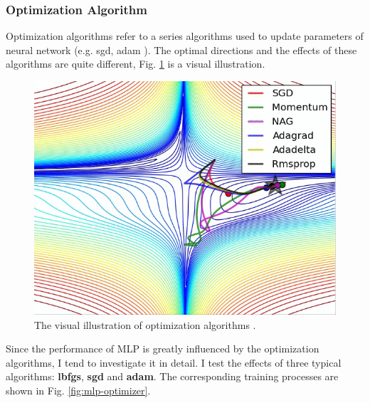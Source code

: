 \documentclass[12pt,a4paper]{article}
\theoremstyle{definition}
\begin{document}
\subsubsection{Optimization Algorithm}
\label{sec:optim}

Optimization algorithms refer to a series algorithms used to update parameters of neural network (e.g. sgd, adam \cite{adam}). The optimal directions and the effects of these algorithms are quite different, Fig. \ref{fig:example} is a visual illustration.

\begin{figure}[H]
	\centering
	\includegraphics[width=0.45\linewidth]{img/optim_example.png}
	\caption{The visual illustration of optimization algorithms \cite{optim_example}.}
	\label{fig:example}
\end{figure}

Since the performance of MLP is greatly influenced by the optimization algorithms, I tend to investigate it in detail. I test the effects of three typical algorithms: \textbf{lbfgs}, \textbf{sgd} and \textbf{adam}. The corresponding training processes are shown in Fig. \ref{fig:mlp-optimizer}.
\end{document}
